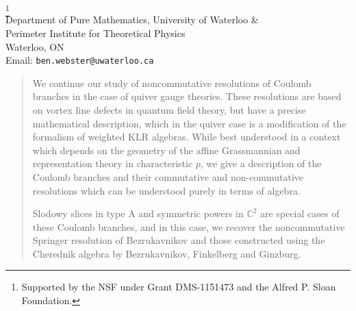 \documentclass[12pt,final]{amsart}
\begin{document}
 \usetikzlibrary{decorations.pathreplacing,backgrounds,decorations.markings,shapes.geometric,decorations.pathmorphing}
\begin{center}
\noindent {\large  \bf \thetitle}
\medskip

\footnote{Supported by the NSF under Grant
  DMS-1151473 and the Alfred P. Sloan Foundation.}\\  
Department of Pure Mathematics, University of Waterloo \& \\
 Perimeter Institute for Theoretical Physics\\
Waterloo, ON\\
Email: {\tt ben.webster@uwaterloo.ca}
\end{center}
\bigskip
{\small
\begin{quote}
We continue our study of noncommutative resolutions of Coulomb
branches in the case of quiver gauge theories.  These resolutions are
based on vortex line defects in quantum field theory, but have 
a precise mathematical description, which in the quiver case is a modification
of the formalism of weighted KLR algebras.  While best understood in a
context which depends on the geometry of the affine Grassmannian and
representation theory in characteristic $p$, we give a description of
the Coulomb branches and their commutative and non-commutative
resolutions which can be understood purely in terms of algebra.  

Slodowy
slices in type A and symmetric powers in $\mathbb{C}^2$ 
are special cases of these Coulomb branches, and in this case, we
recover the noncommutative Springer resolution of Bezrukavnikov and
those constructed using the Cherednik algebra by Bezrukavnikov,
Finkelberg and Ginzburg.     
\end{quote}
}
\setcounter{section}{4}
\setcounter{itheorem}{3}

%
 
% 


\printglossaries



\end{document}
